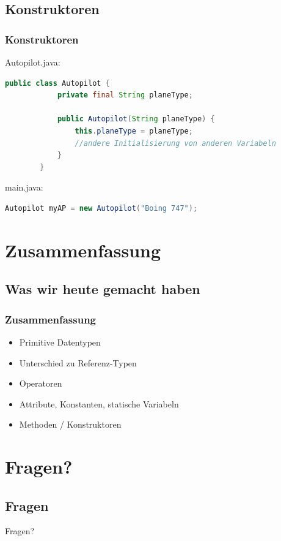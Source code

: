 \documentclass[18pt]{beamer}
\begin{document}

\subsection{Konstruktoren}
\begin{frame}[fragile]
	\frametitle{Konstruktoren}
	
	Autopilot.java:
	\begin{lstlisting}[language=java]
		public class Autopilot {
			private final String planeType;
			
			public Autopilot(String planeType) {
				this.planeType = planeType;
				//andere Initialisierung von anderen Variabeln
			}
		}
	\end{lstlisting}
	
	
	main.java:
	\begin{lstlisting}[language=java]
		Autopilot myAP = new Autopilot("Boing 747");
	\end{lstlisting}
\end{frame}

\section{Zusammenfassung}
\subsection{Was wir heute gemacht haben}
\begin{frame}
	\frametitle{Zusammenfassung}
	\begin{itemize}
		\item Primitive Datentypen
		\item Unterschied zu Referenz-Typen
		\item Operatoren
		\item Attribute, Konstanten, statische Variabeln
		\item Methoden / Konstruktoren
	\end{itemize}
\end{frame}

\section{Fragen?}
\subsection*{Fragen} %
\begin{frame}	
	\begin{center}
		\huge{Fragen?}
	\end{center}
\end{frame}
\end{document}

